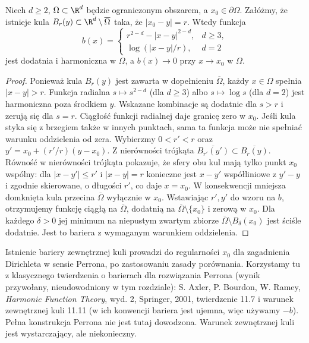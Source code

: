 \begin{stwierdzenie}
\label{prop:pde19-exterior-ball}
Niech $d\ge2$, $\Omega\subset\R^d$ będzie ograniczonym
obszarem, a $x_0\in\partial\Omega$. Załóżmy, że istnieje
kula $B_r(y)\subset\R^d\setminus\overline\Omega$
taka, że $|x_0-y|=r$. Wtedy funkcja
\[
 b(x)=\begin{cases}
 r^{2-d}-|x-y|^{2-d},&d\ge3,\\[2pt]
 \log(|x-y|/r),&d=2
 \end{cases}
\]
jest dodatnia i harmoniczna w $\Omega$, a
$b(x)\to0$ przy $x\to x_0$ w $\Omega$.
\end{stwierdzenie}
\begin{proof}
Ponieważ kula $B_r(y)$ jest zawarta w dopełnieniu
$\overline\Omega$, każdy $x\in\Omega$ spełnia
$|x-y|>r$. Funkcja radialna $s\mapsto s^{2-d}$
(dla $d\ge3$) albo $s\mapsto\log s$ (dla $d=2$)
jest harmoniczna poza środkiem $y$. Wskazane kombinacje
są dodatnie dla $s>r$ i zerują się dla $s=r$.
Ciągłość funkcji radialnej daje granicę zero w $x_0$.
Jeśli kula styka się z brzegiem także w innych punktach,
sama ta funkcja może nie spełniać warunku oddzielenia
od zera. Wybierzmy $0<r'<r$ oraz
$y'=x_0+(r'/r)(y-x_0)$. Z nierówności trójkąta
$\overline{B_{r'}(y')}\subset\overline{B_r(y)}$.
Równość w nierówności trójkąta pokazuje, że sfery
obu kul mają tylko punkt $x_0$ wspólny: dla
$|x-y'|\le r'$ i $|x-y|=r$ konieczne jest
$x-y'$ współliniowe z $y'-y$ i zgodnie skierowane,
o długości $r'$, co daje $x=x_0$.
W konsekwencji mniejsza domknięta kula przecina
$\overline\Omega$ wyłącznie w $x_0$. Wstawiając
$r',y'$ do wzoru na $b$, otrzymujemy funkcję ciągłą
na $\overline\Omega$, dodatnią na
$\overline\Omega\setminus\{x_0\}$ i zerową w $x_0$.
Dla każdego $\delta>0$ jej minimum na niepustym
zwartym zbiorze $\overline\Omega\setminus B_\delta(x_0)$
jest ściśle dodatnie. Jest to bariera z wymaganym
warunkiem oddzielenia.
\end{proof}

\begin{uwaga}
Istnienie bariery zewnętrznej kuli prowadzi do regularności
$x_0$ dla zagadnienia Dirichleta w sensie Perrona, po
zastosowaniu zasady porównania. Korzystamy tu z klasycznego twierdzenia o barierach
dla rozwiązania Perrona (wynik przywołany, nieudowodniony
w tym rozdziale): S. Axler, P. Bourdon, W. Ramey,
\emph{Harmonic Function Theory}, wyd. 2, Springer, 2001,
twierdzenie 11.7 i warunek zewnętrznej kuli 11.11
(w ich konwencji bariera jest ujemna, więc używamy $-b$). Pełna konstrukcja Perrona
nie jest tutaj dowodzona. Warunek zewnętrznej kuli jest
wystarczający, ale niekonieczny.
\end{uwaga}

